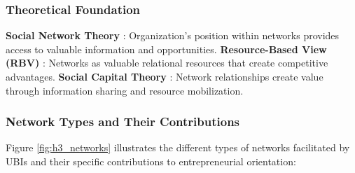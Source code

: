 \documentclass[../Main.tex]{subfiles}
\begin{document}
    \subsubsection{Theoretical Foundation}
    \textbf{Social Network Theory} \cite{granovetter1973strength}: Organization's position within networks provides access to valuable information and opportunities. 
    \textbf{Resource-Based View (RBV)} \cite{barney1991firm}: Networks as valuable relational resources that create competitive advantages. 
    \textbf{Social Capital Theory} \cite{coleman1988social}: Network relationships create value through information sharing and resource mobilization.

    \subsubsection{Network Types and Their Contributions}
    Figure \ref{fig:h3_networks} illustrates the different types of networks facilitated by UBIs and their specific contributions to entrepreneurial orientation:
\end{document}
